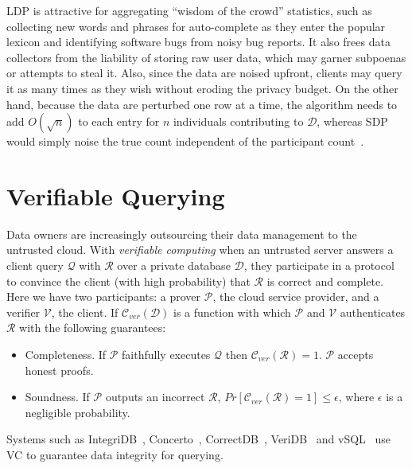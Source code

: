 \documentclass[11pt]{article}
\newcommand{\db}{$\mathcal{D}$\xspace}
\newcommand{\answer}{$\mathcal{R}$\xspace}
\newcommand{\query}{$\mathcal{Q}$\xspace}
\newcommand{\prover}{$\mathcal{P}$\xspace}
\newcommand{\verifier}{$\mathcal{V}$\xspace}
\begin{document}
LDP is attractive for aggregating ``wisdom of the crowd'' statistics, such as collecting new words and phrases for auto-complete as they enter the popular lexicon and identifying software bugs from noisy bug reports.  It also frees data collectors from the liability of storing raw user data, which may garner subpoenas or attempts to steal it.  Also, since the data are noised upfront,  clients may query it as many times as they wish without eroding the privacy budget.  On the other hand, because the data are perturbed one row at a time, the algorithm needs to add $O(\sqrt{n})$ to each entry for $n$ individuals contributing to \db, whereas SDP would simply noise the true count independent of the participant count~\cite{wagh2021dp}.




\section{Verifiable Querying}
\label{sec:verifiable}

Data owners are increasingly outsourcing their data management to the untrusted cloud.   With {\em verifiable computing} when an untrusted server answers a client query \query with \answer over a private database \db, they participate in a protocol to convince the client (with high probability) that \answer is correct and complete.   Here we have two participants: a prover \prover, the cloud service provider, and a verifier \verifier, the client.   If $\mathcal{C}_{ver}(\mathcal{D})$ is a function with which \prover and \verifier authenticates $\mathcal{R}$ with the following guarantees:
\vspace{-0.2cm}
\begin{itemize}
    \item Completeness.  If \prover faithfully executes \query then $ \mathcal{C}_{ver}(\mathcal{R})=1$.  \prover accepts honest proofs.
    \vspace{-0.3cm}
    \item Soundness.  If \prover outputs an incorrect \answer,  $Pr[\mathcal{C}_{ver}(\mathcal{R})=1] \leq \epsilon$, where $\epsilon$ is a negligible probability.
\end{itemize}
\vspace{-0.2cm}
Systems such as IntegriDB~\cite{zhang2015integridb}, Concerto~\cite{arasu2017concerto}, CorrectDB~\cite{bajaj2013correctdb}, VeriDB~\cite{zhou2021veridb} and vSQL~\cite{zhang2017vsql} use VC to guarantee data integrity for querying.  
\end{document}
